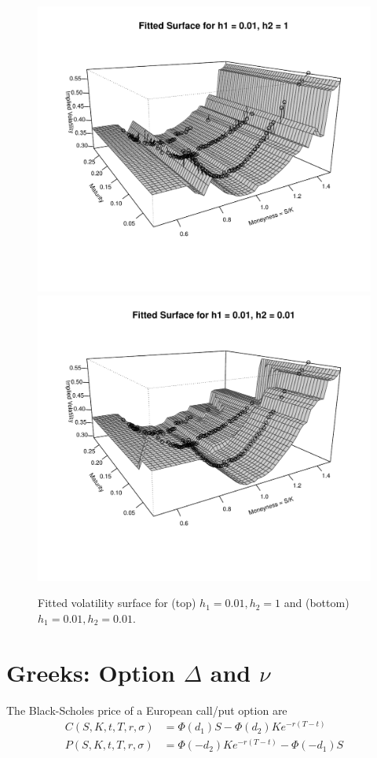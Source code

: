 \documentclass[11pt]{article}
\begin{document}
\begin{figure}[H]
	\centering
 	\includegraphics[scale=0.675]{../plots/q2/fitted_2d_001_1.pdf}
	\includegraphics[scale=0.675]{../plots/q2/fitted_2d_001_001.pdf}
\caption{Fitted volatility surface for (top) $h_1 = 0.01, h_2 = 1$ and (bottom) $h_1 = 0.01, h_2 = 0.01$.}
\label{fig:fitted_2d_001_1}
\end{figure}


\newpage
\section{Greeks: Option $\Delta$ and $\nu$}
\footnotesize
The Black-Scholes price of a European call/put option are
\begin{align*}
	C(S,K, t, T, r, \sigma) &= \Phi(d_1)S - \Phi(d_2)Ke^{-r(T - t)} \\
	P(S,K, t, T, r, \sigma) &= \Phi(-d_2)Ke^{-r(T - t)} - \Phi(-d_1)S
\end{align*}
\end{document}
